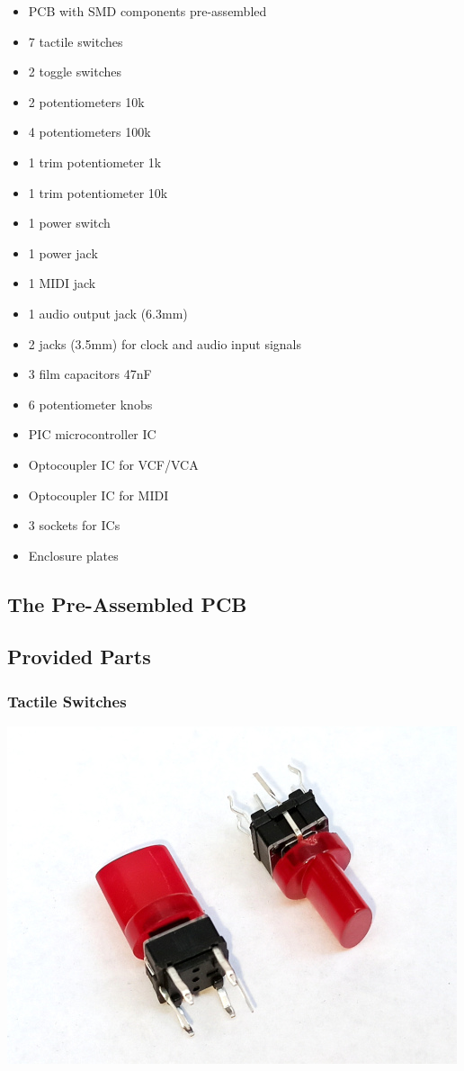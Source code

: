 \documentclass{scrartcl}
\begin{document}
\begin{itemize}
    \item PCB with SMD components pre-assembled
    \item 7 tactile switches
    \item 2 toggle switches
    \item 2 potentiometers 10k
    \item 4 potentiometers 100k
    \item 1 trim potentiometer 1k
    \item 1 trim potentiometer 10k
    \item 1 power switch
    \item 1 power jack
    \item 1 MIDI jack
    \item 1 audio output jack (6.3mm)
    \item 2 jacks (3.5mm) for clock and audio input signals
    \item 3 film capacitors 47nF
    \item 6 potentiometer knobs
    \item PIC microcontroller IC
    \item Optocoupler IC for VCF/VCA
    \item Optocoupler IC for MIDI
    \item 3 sockets for ICs
    \item Enclosure plates
\end{itemize}

\subsection{The Pre-Assembled PCB}

\subsection{Provided Parts}

\subsubsection{Tactile Switches}

\begin{center}
    \includegraphics[scale=0.5]{assets/zekit-tacts-resized.jpg}
\end{center}
\end{document}

